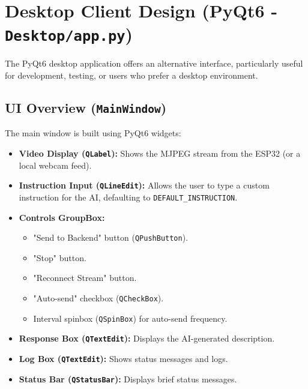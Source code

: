 \documentclass[12pt, a4paper]{report}
\begin{document}
\section{Desktop Client Design (PyQt6 - \texttt{Desktop/app.py})}
The PyQt6 desktop application offers an alternative interface, particularly useful for development, testing, or users who prefer a desktop environment.
\subsection{UI Overview (\texttt{MainWindow})}
The main window is built using PyQt6 widgets:
\begin{itemize}
    \item \textbf{Video Display (\texttt{QLabel}):} Shows the MJPEG stream from the ESP32 (or a local webcam feed).
    \item \textbf{Instruction Input (\texttt{QLineEdit}):} Allows the user to type a custom instruction for the AI, defaulting to \texttt{DEFAULT\_INSTRUCTION}.
    \item \textbf{Controls GroupBox:}
        \begin{itemize}
            \item "Send to Backend" button (\texttt{QPushButton}).
            \item "Stop" button.
            \item "Reconnect Stream" button.
            \item "Auto-send" checkbox (\texttt{QCheckBox}).
            \item Interval spinbox (\texttt{QSpinBox}) for auto-send frequency.
        \end{itemize}
    \item \textbf{Response Box (\texttt{QTextEdit}):} Displays the AI-generated description.
    \item \textbf{Log Box (\texttt{QTextEdit}):} Shows status messages and logs.
    \item \textbf{Status Bar (\texttt{QStatusBar}):} Displays brief status messages.
\end{itemize}
\end{document}
